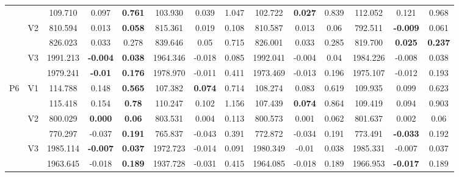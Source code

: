 \documentclass[12pt,a4paper]{article}
\begin{document}
\begin{sidewaystable}[ht]
{\begin{tabular}{cc|ccc|ccc|ccc|ccc|}
   &  & 109.710 & 0.097 & \textbf{0.761} & 103.930 & 0.039 & 1.047 & 102.722 & \textbf{0.027} & 0.839 & 112.052 & 0.121 & 0.968 \\ 
   & \multirow{2}{*}{V2} & 810.594 & 0.013 & \textbf{0.058} & 815.361 & 0.019 & 0.108 & 810.587 & 0.013 & 0.06 & 792.511 & \textbf{-0.009} & 0.061 \\ 
   &  & 826.023 & 0.033 & 0.278 & 839.646 & 0.05 & 0.715 & 826.001 & 0.033 & 0.285 & 819.700 & \textbf{0.025} & \textbf{0.237} \\ 
   & \multirow{2}{*}{V3} & 1991.213 & \textbf{-0.004} & \textbf{0.038} & 1964.346 & -0.018 & 0.085 & 1992.041 & -0.004 & 0.04 & 1984.226 & -0.008 & 0.038 \\ 
   &  & 1979.241 & \textbf{-0.01} & \textbf{0.176} & 1978.970 & -0.011 & 0.411 & 1973.469 & -0.013 & 0.196 & 1975.107 & -0.012 & 0.193 \\ 
   \hline \hline\multirow{6}{*}{P6} & \multirow{2}{*}{V1} & 114.788 & 0.148 & \textbf{0.565} & 107.382 & \textbf{0.074} & 0.714 & 108.274 & 0.083 & 0.619 & 109.935 & 0.099 & 0.623 \\ 
   &  & 115.418 & 0.154 & \textbf{0.78} & 110.247 & 0.102 & 1.156 & 107.439 & \textbf{0.074} & 0.864 & 109.419 & 0.094 & 0.903 \\ 
   & \multirow{2}{*}{V2} & 800.029 & \textbf{0.000} & \textbf{0.06} & 803.531 & 0.004 & 0.113 & 800.573 & 0.001 & 0.062 & 801.637 & 0.002 & 0.06 \\ 
   &  & 770.297 & -0.037 & \textbf{0.191} & 765.837 & -0.043 & 0.391 & 772.872 & -0.034 & 0.191 & 773.491 & \textbf{-0.033} & 0.192 \\ 
   & \multirow{2}{*}{V3} & 1985.114 & \textbf{-0.007} & \textbf{0.037} & 1972.723 & -0.014 & 0.091 & 1980.349 & -0.01 & 0.038 & 1985.331 & -0.007 & 0.037 \\ 
   &  & 1963.645 & -0.018 & \textbf{0.189} & 1937.728 & -0.031 & 0.415 & 1964.085 & -0.018 & 0.189 & 1966.953 & \textbf{-0.017} & 0.189 \\ 
   \hline
\end{tabular}
}
\end{sidewaystable}
\end{document}
